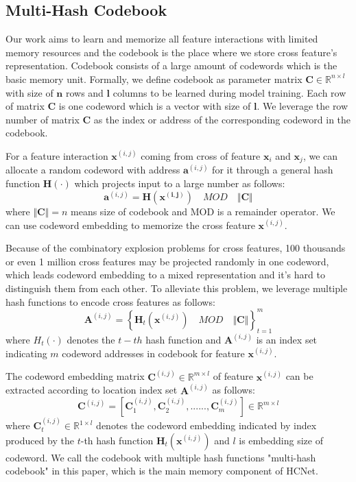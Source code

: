 \documentclass[sigconf,authorversion]{acmart}
\begin{document}
\subsection{Multi-Hash Codebook}
Our work aims to learn and memorize all feature interactions with limited memory resources and the codebook is the place where we store cross feature's representation. Codebook consists of a large amount of codewords  which  is the basic memory unit. Formally, we define codebook as parameter matrix $\mathbf{C}\in \mathbb{R}^{n \times l}$ with size of $\mathbf{n}$ rows and $\mathbf{l}$ columns to be learned during model training. Each row of matrix $\mathbf{C}$ is one codeword which is a vector with size of $\mathbf{l}$. We leverage the row number of matrix $\mathbf{C}$ as the index or address of the corresponding codeword in the codebook.


For a feature interaction $\mathbf{x}^{(i,j)}$ coming from cross of feature $\mathbf{x}_i$ and $\mathbf{x}_j$, we can allocate a random codeword with address $\mathbf{a}^{(i,j)}$ for it through a general hash function $\mathbf{H(\cdot)}$ which projects input to a large number as follows:
\begin{equation}
  \mathbf{a}^{(i,j)}=
  \mathbf{H(\mathbf{x}^{(i,j)})} \quad MOD \quad \Vert \mathbf{C} \Vert
\end{equation}
where $\Vert \mathbf{C} \Vert=n$ means size of codebook and MOD is a remainder operator. We can use codeword embedding to memorize the cross feature $\mathbf{x}^{(i,j)}$.

Because of the combinatory explosion problems for cross features, 100 thousands or even 1 million cross features may be projected randomly in one codeword, which leads codeword embedding to a mixed representation and it's hard to distinguish them from each other. To alleviate this problem, we leverage multiple hash functions to encode cross features as follows:
\begin{equation}
  \mathbf{A}^{(i,j)} = \left\{ \mathbf{H}_t(\mathbf{x}^{(i,j)})  \quad MOD \quad \Vert \mathbf{C} \Vert\right\}_{t=1}^{m}
\end{equation}
where $H_t(\cdot)$ denotes the $t-th$ hash function and $\mathbf{A}^{(i,j)}$ is an index set indicating $m$ codeword addresses in codebook for feature $\mathbf{x}^{(i,j)}$.

The codeword embedding matrix $\mathbf{C}^{(i,j)}\in \mathbb{R}^{m \times l}$ of feature $\mathbf{x}^{(i,j)}$ can be extracted according to location index set $\mathbf{A}^{(i,j)}$ as follows:
 \begin{equation}
         \mathbf{C}^{(i,j)} = [\mathbf{C}_1^{(i,j)},\mathbf{C}_2^{(i,j)},......,\mathbf{C}_m^{(i,j)}]\in \mathbb{R}^{m \times l}
 \end{equation}
where $\mathbf{C}_t^{(i,j)}\in \mathbb{R}^{1 \times l}$ denotes the codeword embedding indicated by index produced by the $t$-th hash function $\mathbf{H}_t(\mathbf{x}^{(i,j)}) $ and $l $ is embedding size of codeword. We call the codebook with multiple hash functions "multi-hash codebook" in this paper, which is the main memory component of HCNet.
\end{document}
